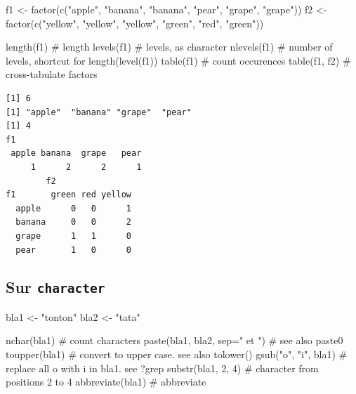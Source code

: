 \documentclass[
  letterpaper,
  DIV=11,
  numbers=noendperiod]{scrreprt}
\newenvironment{Shaded}{\begin{snugshade}}{\end{snugshade}}
\newcommand{\AttributeTok}[1]{\textcolor[rgb]{0.40,0.45,0.13}{#1}}
\newcommand{\CommentTok}[1]{\textcolor[rgb]{0.37,0.37,0.37}{#1}}
\newcommand{\DecValTok}[1]{\textcolor[rgb]{0.68,0.00,0.00}{#1}}
\newcommand{\FunctionTok}[1]{\textcolor[rgb]{0.28,0.35,0.67}{#1}}
\newcommand{\NormalTok}[1]{\textcolor[rgb]{0.00,0.23,0.31}{#1}}
\newcommand{\OtherTok}[1]{\textcolor[rgb]{0.00,0.23,0.31}{#1}}
\newcommand{\StringTok}[1]{\textcolor[rgb]{0.13,0.47,0.30}{#1}}
\begin{document}
\begin{Shaded}
\begin{Highlighting}[]
\NormalTok{f1 }\OtherTok{\textless{}{-}} \FunctionTok{factor}\NormalTok{(}\FunctionTok{c}\NormalTok{(}\StringTok{"apple"}\NormalTok{, }\StringTok{"banana"}\NormalTok{, }\StringTok{"banana"}\NormalTok{, }\StringTok{"pear"}\NormalTok{, }\StringTok{"grape"}\NormalTok{, }\StringTok{"grape"}\NormalTok{))}
\NormalTok{f2 }\OtherTok{\textless{}{-}} \FunctionTok{factor}\NormalTok{(}\FunctionTok{c}\NormalTok{(}\StringTok{"yellow"}\NormalTok{, }\StringTok{"yellow"}\NormalTok{, }\StringTok{"yellow"}\NormalTok{, }\StringTok{"green"}\NormalTok{, }\StringTok{"red"}\NormalTok{, }\StringTok{"green"}\NormalTok{))}

\FunctionTok{length}\NormalTok{(f1)  }\CommentTok{\# length}
\FunctionTok{levels}\NormalTok{(f1)  }\CommentTok{\# levels, as character}
\FunctionTok{nlevels}\NormalTok{(f1) }\CommentTok{\# number of levels, shortcut for length(level(f1))}
\FunctionTok{table}\NormalTok{(f1)   }\CommentTok{\# count occurences}
\FunctionTok{table}\NormalTok{(f1, f2) }\CommentTok{\# cross{-}tabulate factors}
\end{Highlighting}
\end{Shaded}

\begin{verbatim}
[1] 6
[1] "apple"  "banana" "grape"  "pear"  
[1] 4
f1
 apple banana  grape   pear 
     1      2      2      1 
        f2
f1       green red yellow
  apple      0   0      1
  banana     0   0      2
  grape      1   1      0
  pear       1   0      0
\end{verbatim}

\hypertarget{sur-character}{%
\subsection{\texorpdfstring{Sur
\texttt{character}}{Sur character}}\label{sur-character}}

\begin{Shaded}
\begin{Highlighting}[]
\NormalTok{bla1 }\OtherTok{\textless{}{-}} \StringTok{"tonton"}
\NormalTok{bla2 }\OtherTok{\textless{}{-}} \StringTok{"tata"}

\FunctionTok{nchar}\NormalTok{(bla1) }\CommentTok{\# count characters}
\FunctionTok{paste}\NormalTok{(bla1, bla2, }\AttributeTok{sep=}\StringTok{" et "}\NormalTok{) }\CommentTok{\# see also paste0}
\FunctionTok{toupper}\NormalTok{(bla1) }\CommentTok{\# convert to upper case. see also tolower()}
\FunctionTok{gsub}\NormalTok{(}\StringTok{"o"}\NormalTok{, }\StringTok{"i"}\NormalTok{, bla1) }\CommentTok{\# replace all \textquotesingle{}o\textquotesingle{} with \textquotesingle{}i\textquotesingle{} in bla1. see ?grep}
\FunctionTok{substr}\NormalTok{(bla1, }\DecValTok{2}\NormalTok{, }\DecValTok{4}\NormalTok{) }\CommentTok{\# character from positions 2 to 4}
\FunctionTok{abbreviate}\NormalTok{(bla1) }\CommentTok{\# abbreviate}
\end{Highlighting}
\end{Shaded}
\end{document}
